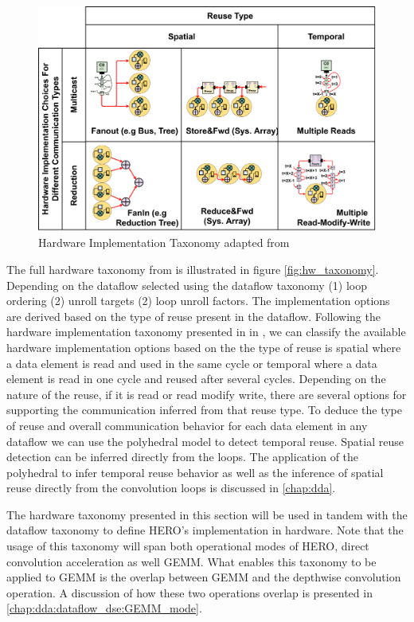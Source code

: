 \begin{figure}[ht]
    \centering
    \includegraphics[scale=0.58]{fig/hw_taxonomy.pdf}
    \caption{Hardware Implementation Taxonomy adapted from \cite{maestro}}
    \label{fig:hw_taxonomy}
\end{figure}


The full hardware taxonomy from \cite{maestro} is illustrated in figure
\autoref{fig:hw_taxonomy}. Depending on the dataflow selected using the dataflow
taxonomy (1) loop ordering (2) unroll targets (2) loop unroll factors. The
implementation options are derived based on the type of reuse present in the
dataflow. Following the hardware implementation taxonomy presented in in
\cite{maestro}, we can classify the available hardware implementation options
based on the the type of reuse is spatial where a data element is read and used
in the same cycle or temporal where a data element is read in one cycle and
reused after several cycles. Depending on the nature of the reuse, if it is read
or read modify write, there are several options for supporting the communication
inferred from that reuse type. To deduce the type of reuse and overall
communication behavior for each data element in any dataflow we can use the
polyhedral model to detect temporal reuse. Spatial reuse detection can be
inferred directly from the loops. The application of the polyhedral to infer
temporal reuse behavior as well as the inference of spatial reuse directly from
the convolution loops is discussed in \autoref{chap:dda}.

The hardware taxonomy presented in this section will
be used in tandem with the dataflow taxonomy to define HERO's implementation in
hardware. Note that the usage of this taxonomy will span both operational modes
of HERO, direct convolution acceleration as well GEMM. What enables this
taxonomy to be applied to GEMM is the overlap between GEMM and the depthwise
convolution operation. A discussion of how these two operations overlap is
presented in \autoref{chap:dda:dataflow_dse:GEMM_mode}. 


